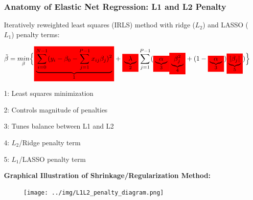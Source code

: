 \documentclass[11pt,aspectratio=169,hyperref={colorlinks}]{beamer}
\newcommand{\mathcolorbox}[2]{\colorbox{#1}{$\displaystyle #2$}}
\begin{document}
		\begin{frame}
		
			\frametitle{Anatomy of Elastic Net Regression: L1 and L2 Penalty}			
		Iteratively reweighted least squares (IRLS) method with ridge ($L_2$) and LASSO ($L_1$) penalty terms: 
			
			\begin{equation}
				\label{eq:Elastic_Net}
				\begin{aligned}
				\tilde{\beta}= \underset{\beta}{min}\Big\{ \mathcolorbox{red}{ \underbrace{\sum_{i=0}^{N-1}(y_i-\beta_0-\sum_{j=1}^{P-1} x_{ij} \beta_{j})^2}_\text{1}} + \mathcolorbox{red}{\underbrace{\lambda}_\text{2}} \sum_{j=1}^{P-1} ( \mathcolorbox{red}{\underbrace{\alpha}_\text{3}} \mathcolorbox{red}{\underbrace{\beta_j^2}_\text{4}} + (1-\mathcolorbox{red}{\underbrace{\alpha}_\text{3}}) \mathcolorbox{red}{\underbrace{|\beta_{j}|}_\text{5}}) \Big\}
				\end{aligned}
			\end{equation}		
			
			\begin{itemize}
			\scriptsize{
				\item{1: Least squares minimization}
				\item{2: Controls magnitude of penalties}
				\item{3: Tunes balance between L1 and L2}
				\item{4: $L_2$/Ridge penalty term}
				\item{5: $L_1$/LASSO penalty term}}
			\end{itemize}
						
		\end{frame}
	
		\begin{frame}
			
			\textbf{Graphical Illustration of Shrinkage/Regularization Method:} 
			
			\begin{figure}[htb]
				\begin{center}
					\texttt{[image: ../img/L1L2\_penalty\_diagram.png]}
					\label{fig:L1L2}
				\end{center}
			\end{figure}
								
		\end{frame}				
\end{document}
